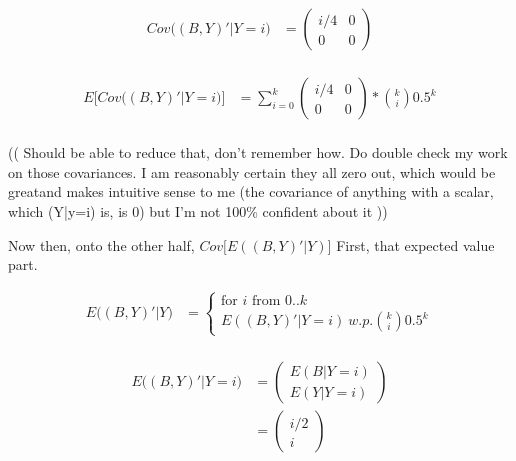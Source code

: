 \documentclass[12pt]{article}
\begin{document}
\begin{equation*}
	\begin{aligned}
		Cov\big((B,Y)' | Y=i\big) &=
		 \left(
		\begin{array}{cc}
			i/4 & 0\\
			0 & 0
		\end{array}
		\right) \\
	\end{aligned}
\end{equation*}

\begin{equation*}
	\begin{aligned}
		E\Big[Cov\big((B,Y)' | Y=i\big)\Big] &=
		\sum_{i=0}^{k} 
		\left(
		\begin{array}{cc}
			i/4 & 0\\
			0 & 0
		\end{array}
		\right) * \binom{k}{i} 0.5^k\\
	\end{aligned}
\end{equation*}

(( Should be able to reduce that, don't remember how. Do double check my work on those covariances. I am reasonably certain they all zero out, which would be greatand makes intuitive sense to me (the covariance of anything with a scalar, which (Y|y=i) is, is 0) but I'm not 100\% confident about it ))

Now then, onto the other half, $Cov\big[E((B,Y)'|Y)\big]$ First, that expected value part.

\begin{equation*}
	\begin{aligned}
		E\big((B,Y)' | Y\big) &=
		\begin{cases}
			\textrm{for $i$ from $0..k$} \\
			E((B,Y)'|Y=i)\: w.p.\binom{k}{i} 0.5^k
		\end{cases}
		\\
	\end{aligned}
\end{equation*}

\begin{equation*}
	\begin{aligned}
		E\big((B,Y)' | Y=i\big) &=
		 \left(
		\begin{array}{c}
			E(B|Y=i) \\
			E(Y|Y=i)
		\end{array}
		\right) \\
		&=
		 \left(
		\begin{array}{c}
			i/2 \\
			i
		\end{array}
		\right) \\
	\end{aligned}
\end{equation*}
\end{document}
